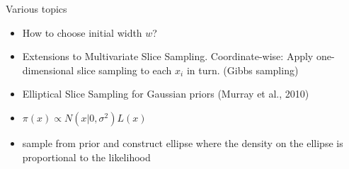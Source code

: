 \begin{frame}{Various topics}
	\begin{itemize}
		\item How to choose initial width $w$?
		\item Extensions to Multivariate Slice Sampling. Coordinate-wise: Apply one-dimensional slice sampling to
each $x_i$ in turn. (Gibbs sampling)
		\item Elliptical Slice Sampling for Gaussian priors (Murray et al., 2010)
		\item $\pi ( x ) \propto N ( x | 0, \sigma^2 ) L ( x )$
		\item sample from prior and construct ellipse where the density on the ellipse is proportional to the likelihood
	\end{itemize}
\end{frame}

